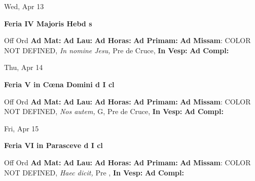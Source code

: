 \documentclass[10pt]{book}
\begin{document}
\begin{center}
\begin{minipage}{3.5in}
\vspace{2em}
\begin{center}Wed, Apr 13
\end{center}
\textbf{ \large Feria IV Majoris Hebd
\textnormal{\normalsize s}}

\begin{justify}Off Ord
\textbf{Ad Mat: }
\textbf{Ad Lau: }
\textbf{Ad Horas: }
\textbf{Ad Primam: }\textbf{Ad Missam}: COLOR NOT DEFINED, \textit{In nomine Jesu,} Pre de Cruce, 
\textbf{In Vesp: }
\textbf{Ad Compl: }
\end{justify}
\end{minipage}
\end{center}

\begin{center}
\begin{minipage}{3.5in}
\vspace{2em}
\begin{center}Thu, Apr 14
\end{center}
\textbf{ \large Feria V in Cœna Domini
\textnormal{\normalsize d I cl}}

\begin{justify}Off Ord
\textbf{Ad Mat: }
\textbf{Ad Lau: }
\textbf{Ad Horas: }
\textbf{Ad Primam: }\textbf{Ad Missam}: COLOR NOT DEFINED, \textit{Nos autem,} G, Pre de Cruce, 
\textbf{In Vesp: }
\textbf{Ad Compl: }
\end{justify}
\end{minipage}
\end{center}

\begin{center}
\begin{minipage}{3.5in}
\vspace{2em}
\begin{center}Fri, Apr 15
\end{center}
\textbf{ \large Feria VI in Parasceve
\textnormal{\normalsize d I cl}}

\begin{justify}Off Ord
\textbf{Ad Mat: }
\textbf{Ad Lau: }
\textbf{Ad Horas: }
\textbf{Ad Primam: }\textbf{Ad Missam}: COLOR NOT DEFINED, \textit{Haec dicit,} Pre , 
\textbf{In Vesp: }
\textbf{Ad Compl: }
\end{justify}
\end{minipage}
\end{center}
\end{document}
